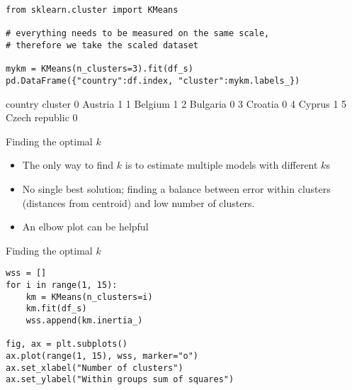\begin{frame}
\begin{lstlisting}
from sklearn.cluster import KMeans

# everything needs to be measured on the same scale,
# therefore we take the scaled dataset

mykm = KMeans(n_clusters=3).fit(df_s)
pd.DataFrame({"country":df.index, "cluster":mykm.labels_})
\end{lstlisting}

\begin{lstlistingoutputtiny}
           country  cluster
0          Austria        1
1          Belgium        1
2         Bulgaria        0
3          Croatia        0
4           Cyprus        1
5   Czech republic        0
\end{lstlistingoutputtiny}

\end{frame}



\begin{frame}{Finding the optimal $k$}

\begin{itemize}
\item The only way to find $k$ is to estimate multiple models with different $k$s
\item No single best solution; finding a balance between error within clusters (distances from centroid) and low number of clusters.
\item An elbow plot can be helpful
\end{itemize}
\end{frame}


\begin{frame}{Finding the optimal $k$}
\begin{verbatim}
wss = []
for i in range(1, 15):
    km = KMeans(n_clusters=i)
    km.fit(df_s)
    wss.append(km.inertia_)

fig, ax = plt.subplots()
ax.plot(range(1, 15), wss, marker="o")
ax.set_xlabel("Number of clusters")
ax.set_ylabel("Within groups sum of squares")
\end{verbatim}


\end{frame}






